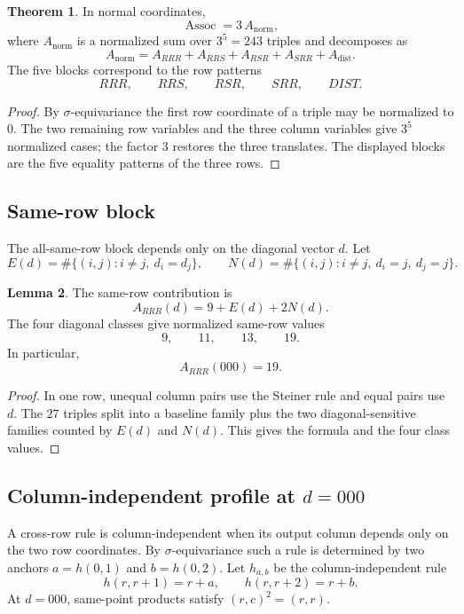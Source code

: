 \documentclass[11pt]{article}
\theoremstyle{definition}
\newtheorem{theorem}{Theorem}[section]
\newtheorem{lemma}[theorem]{Lemma}
\begin{document}
\begin{theorem}
\label{thm:4.1}
In normal coordinates, \[
\operatorname{Assoc}=3\,A_{\mathrm{norm}},
\] where \(A_{\mathrm{norm}}\) is a normalized sum over \(3^5=243\) triples and
decomposes as \[
A_{\mathrm{norm}}=A_{RRR}+A_{RRS}+A_{RSR}+A_{SRR}+A_{\mathrm{dist}}.
\] The five blocks correspond to the row patterns \[
RRR,
\qquad RRS,
\qquad RSR,
\qquad SRR,
\qquad DIST.
\]
\end{theorem}

\begin{proof}
By \(\sigma\)-equivariance the first row coordinate of a
triple may be normalized to \(0\). The two remaining row variables and
the three column variables give \(3^5\) normalized cases; the factor
\(3\) restores the three translates. The displayed blocks are the five
equality patterns of the three rows.
\end{proof}

\subsection{Same-row block}\label{assoc-same-row-block}\label{the-same-row-block}

The all-same-row block depends only on the diagonal vector \(d\). Let \[
E(d)=\#\{(i,j):i\ne j,
\ d_i=d_j\},
\qquad
N(d)=\#\{(i,j):i\ne j,
\ d_i=j,
\ d_j=j\}.
\]

\begin{lemma}
\label{lem:4.2}
The same-row contribution is \[
A_{RRR}(d)=9+E(d)+2N(d).
\] The four diagonal classes give normalized same-row values \[
9,\qquad 11,\qquad 13,\qquad 19.
\] In particular, \[
A_{RRR}(000)=19.
\]
\end{lemma}

\begin{proof}
In one row, unequal column pairs use the Steiner rule
and equal pairs use \(d\). The \(27\) triples split into a baseline
family plus the two diagonal-sensitive families counted by \(E(d)\) and
\(N(d)\). This gives the formula and the four class values.
\end{proof}

\subsection[Column-independent profile at d=000]{Column-independent profile at \(d=000\)}\label{assoc-column-independent-profile}\label{column-independent-profile-at-d000}

A cross-row rule is column-independent when its output column depends only on the two row coordinates. By \(\sigma\)-equivariance such a rule is determined by two anchors \(a=h(0,1)\) and \(b=h(0,2)\). Let \(h_{a,b}\) be the column-independent rule \[
h(r,r+1)=r+a,
\qquad
h(r,r+2)=r+b.
\] At \(d=000\), same-point products satisfy \((r,c)^2=(r,r)\).
\end{document}
